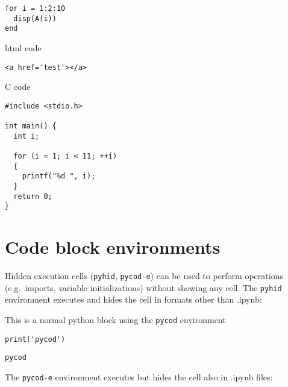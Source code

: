 \documentclass[%
oneside,                 %
final,                   %
chapterprefix=true,      %
open=right,              %
10pt]{book}
\begin{document}
\begin{Verbatim}[numbers=none,fontsize=\fontsize{9pt}{9pt},baselinestretch=0.95]
for i = 1:2:10
  disp(A(i))
end

\end{Verbatim}


html code


\begin{Verbatim}[numbers=none,fontsize=\fontsize{9pt}{9pt},baselinestretch=0.95]
<a href='test'></a>

\end{Verbatim}


C code












\begin{Verbatim}[numbers=none,fontsize=\fontsize{9pt}{9pt},baselinestretch=0.95]
#include <stdio.h>

int main() {
  int i;

  for (i = 1; i < 11; ++i)
  {
    printf("%d ", i);
  }
  return 0;
}

\end{Verbatim}


\section{Code block environments}

Hidden execution cells (\texttt{pyhid}, \texttt{pycod-e}) can be used to perform operations (e.g.~imports, variable initializations) without showing any cell.  
The \texttt{pyhid} environment executes and hides the cell in formats other than .ipynb:

This is a normal python block using the \texttt{pycod} environment


\begin{Verbatim}[numbers=none,fontsize=\fontsize{9pt}{9pt},baselinestretch=0.95]
print('pycod')

\end{Verbatim}

\begin{Verbatim}[numbers=none,fontsize=\fontsize{9pt}{9pt},baselinestretch=0.95]
pycod
\end{Verbatim}







The \texttt{pycod-e} environment executes but hides the cell also in .ipynb files:
\end{document}
